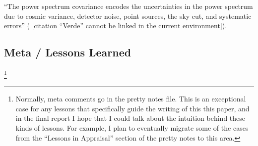 \documentclass[11pt]{article}
\newcommand{\cbib}[1]
{\IfFileExists{biblatex.sty}
{\cite{#1}}
{[citation ``#1'' cannot be linked in the current environment]}}
\begin{document}
``The power spectrum covariance encodes the uncertainties in the power spectrum
due to cosmic variance, detector noise, point sources, the sky cut, and
systematic errors'' (\cbib{Verde}).

\begin{centering}
\section{Meta / Lessons Learned}
\end{centering}

\footnote{Normally, meta comments go in the pretty notes file. This is an
exceptional case for any lessons that specifically guide the writing of this
this paper, and in the final report I hope that I could talk about the
intuition behind these kinds of lessons. For example, I plan to eventually
migrate some of the cases from the ``Lessons in Appraisal'' section of the
pretty notes to this area.
}

 {
    \printbibliography
}
\end{document}
